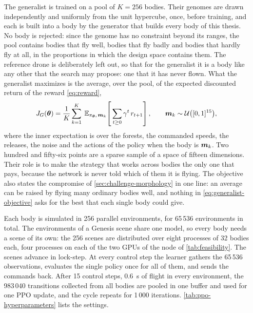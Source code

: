 The generalist is trained on a pool of $K = 256$ bodies. Their genomes are drawn independently and uniformly from the unit hypercube, once, before training, and each is built into a body by the generator that builds every body of this thesis. No body is rejected: since the genome has no constraint beyond its ranges, the pool contains bodies that fly well, bodies that fly badly and bodies that hardly fly at all, in the proportions in which the design space contains them. The reference drone is deliberately left out, so that for the generalist it is a body like any other that the search may propose: one that it has never flown. What the generalist maximizes is the average, over the pool, of the expected discounted return of the reward \eqref{eq:reward},
\begin{equation}
J_G(\bm{\theta}) = \frac{1}{K} \sum_{k=1}^{K}\; \mathbb{E}_{\pi_{\bm{\theta}},\, \bm{m}_k}\!\left[\, \sum_{t \ge 0} \gamma^{t}\, r_{t+1} \right], \qquad \bm{m}_k \sim \mathcal{U}\big([0,1]^{15}\big),
\label{eq:generalist-objective}
\end{equation}
where the inner expectation is over the forests, the commanded speeds, the releases, the noise and the actions of the policy when the body is $\bm{m}_k$. Two hundred and fifty-six points are a sparse sample of a space of fifteen dimensions. Their role is to make the strategy that works across bodies the only one that pays, because the network is never told which of them it is flying. The objective also states the compromise of \autoref{sec:challenge-morphology} in one line: an average can be raised by flying many ordinary bodies well, and nothing in \eqref{eq:generalist-objective} asks for the best that each single body could give.

Each body is simulated in 256 parallel environments, for 65\,536 environments in total. The environments of a Genesis scene share one model, so every body needs a scene of its own: the 256 scenes are distributed over eight processes of 32 bodies each, four processes on each of the two GPUs of the node of \autoref{tab:feasibility}. The scenes advance in lock-step. At every control step the learner gathers the 65\,536 observations, evaluates the single policy once for all of them, and sends the commands back. After 15 control steps, 0.6~s of flight in every environment, the 983\,040 transitions collected from all bodies are pooled in one buffer and used for one PPO update, and the cycle repeats for 1\,000 iterations. \autoref{tab:ppo-hyperparameters} lists the settings.

